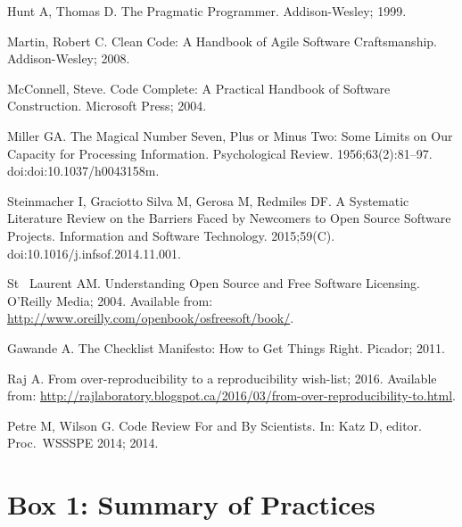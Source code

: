 \documentclass[10pt,letterpaper]{article}
\begin{document}
\begin{thebibliography}{10}
Hunt A, Thomas D.
\newblock The Pragmatic Programmer.
\newblock Addison-Wesley; 1999.

Martin, Robert C.
\newblock Clean Code: A Handbook of Agile Software Craftsmanship.
\newblock Addison-Wesley; 2008.

McConnell, Steve.
\newblock Code Complete: A Practical Handbook of Software Construction.
\newblock Microsoft Press; 2004.

Miller GA.
\newblock The Magical Number Seven, Plus or Minus Two: Some Limits on Our
  Capacity for Processing Information.
\newblock Psychological Review. 1956;63(2):81–97.
\newblock doi:{doi:10.1037/h0043158m}.

Steinmacher I, {Graciotto Silva} M, Gerosa M, Redmiles DF.
\newblock A Systematic Literature Review on the Barriers Faced by Newcomers to
  Open Source Software Projects.
\newblock Information and Software Technology. 2015;59(C).
\newblock doi:{10.1016/j.infsof.2014.11.001}.

{St ~Laurent} AM.
\newblock Understanding Open Source and Free Software Licensing.
\newblock O'Reilly Media; 2004.
\newblock Available from:
  \url{http://www.oreilly.com/openbook/osfreesoft/book/}.

Gawande A.
\newblock The Checklist Manifesto: How to Get Things Right.
\newblock Picador; 2011.

Raj A. From over-reproducibility to a reproducibility wish-list; 2016.
\newblock Available from:
  \url{http://rajlaboratory.blogspot.ca/2016/03/from-over-reproducibility-to.html}.

Petre M, Wilson G.
\newblock Code Review For and By Scientists.
\newblock In: Katz D, editor. Proc.\ WSSSPE 2014; 2014.

\end{thebibliography}

\pagebreak

\section*{Box 1: Summary of Practices}
\end{document}
